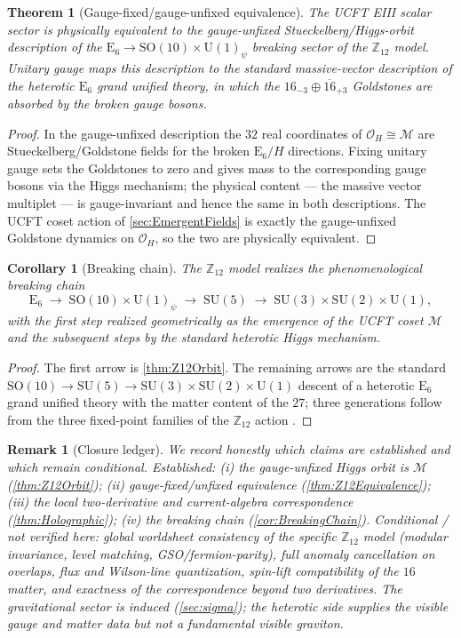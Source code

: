 \documentclass[pdflatex,sn-mathphys-num]{sn-jnl}
\theoremstyle{thmstyleone}
\newtheorem{theorem}{Theorem}
\newtheorem{corollary}[corollary]{Corollary}
\theoremstyle{thmstyletwo}%
\newtheorem{remark}{Remark}%
\theoremstyle{thmstylethree}%
\newcommand{\SU}[1]{\mathrm{SU(#1)}}
\newcommand{\SMSubgroup}{\SU{3}\times\SU{2}\times\U{1}}
\newcommand{\SO}[1]{\mathrm{SO(#1)}}
\newcommand{\U}[1]{\mathrm{U(#1)}}
\newcommand{\E}[1]{\mathrm{E_{#1}}}
\newcommand{\M}{\mathcal{M}}
\newcommand{\SOTen}{\SO{10}}
\newcommand{\UOne}{\U{1}}
\newcommand{\ESix}{\E{6}}
\newcommand{\SOTenXUOne}{\SOTen \times \UOne}
\begin{document}
\begin{theorem}[Gauge-fixed/gauge-unfixed equivalence]
\label{thm:Z12Equivalence}
The UCFT EIII scalar sector is physically equivalent to the gauge-unfixed
Stueckelberg/Higgs-orbit description of the $\ESix\to\SOTenXUOne_\psi$ breaking
sector of the $\mathbb Z_{12}$ model.  Unitary gauge maps this description to the
standard massive-vector description of the heterotic $\ESix$ grand unified
theory, in which the $16_{-3}\oplus\overline{16}_{+3}$ Goldstones are absorbed by
the broken gauge bosons.
\end{theorem}

\begin{proof}
In the gauge-unfixed description the $32$ real coordinates of
$\mathcal O_{H}\cong\M$ are Stueckelberg/Goldstone fields for the broken
$\ESix/H$ directions.  Fixing unitary gauge sets the Goldstones to zero and gives
mass to the corresponding gauge bosons via the Higgs mechanism; the physical
content — the massive vector multiplet — is gauge-invariant and hence the same in
both descriptions.  The UCFT coset action of \autoref{sec:EmergentFields} is exactly
the gauge-unfixed Goldstone dynamics on $\mathcal O_{H}$, so the two are
physically equivalent.
\end{proof}

\begin{corollary}[Breaking chain]
\label{cor:BreakingChain}
The $\mathbb Z_{12}$ model realizes the phenomenological breaking chain
\[
  \ESix\;\to\;\SOTenXUOne_\psi\;\to\;\SU5\;\to\;\SMSubgroup,
\]
with the first step realized geometrically as the emergence of the UCFT coset
$\M$ and the subsequent steps by the standard heterotic Higgs mechanism.
\end{corollary}

\begin{proof}
The first arrow is \autoref{thm:Z12Orbit}.  The remaining arrows are the
standard $\SOTen\to\SU5\to\SMSubgroup$ descent of a heterotic $\ESix$ grand
unified theory with the matter content of the $27$; three generations follow
from the three fixed-point families of the $\mathbb Z_{12}$ action
\cite{Z12Heterotic}.
\end{proof}

\begin{remark}[Closure ledger]
\label{rmk:Ledger}
We record honestly which claims are established and which remain conditional.
\emph{Established:} (i) the gauge-unfixed Higgs orbit is $\M$
(\autoref{thm:Z12Orbit}); (ii) gauge-fixed/unfixed equivalence
(\autoref{thm:Z12Equivalence}); (iii) the local two-derivative and
current-algebra correspondence (\autoref{thm:Holographic}); (iv) the breaking
chain (\autoref{cor:BreakingChain}).  \emph{Conditional / not verified here:}
global worldsheet consistency of the specific $\mathbb Z_{12}$ model (modular
invariance, level matching, GSO/fermion-parity), full anomaly cancellation on
overlaps, flux and Wilson-line quantization, spin-lift compatibility of the
$16$ matter, and exactness of the correspondence beyond two derivatives.  The
gravitational sector is induced (\autoref{sec:sigma}); the heterotic side
supplies the visible gauge and matter data but not a fundamental visible
graviton.
\end{remark}
\end{document}
